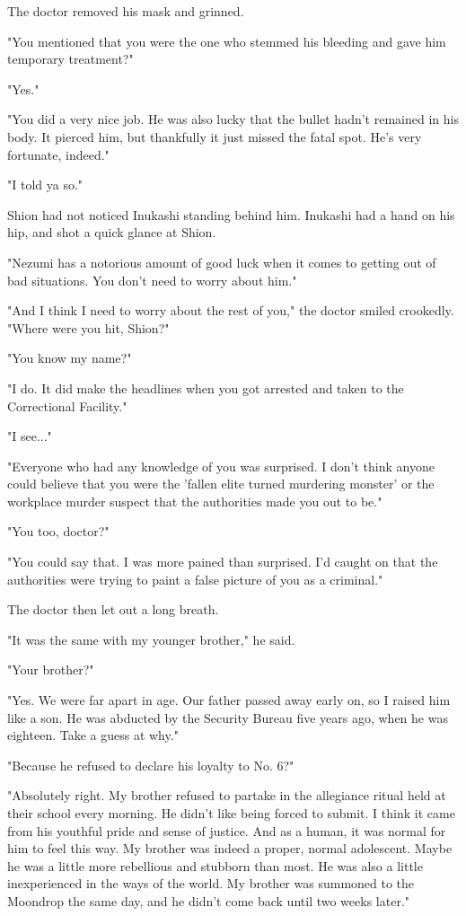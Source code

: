 The doctor removed his mask and grinned.

"You mentioned that you were the one who stemmed his bleeding and gave
him temporary treatment?"

"Yes."

"You did a very nice job. He was also lucky that the bullet hadn't
remained in his body. It pierced him, but thankfully it just missed the
fatal spot. He's very fortunate, indeed."

"I told ya so."

Shion had not noticed Inukashi standing behind him. Inukashi had a hand
on his hip, and shot a quick glance at Shion.

"Nezumi has a notorious amount of good luck when it comes to getting out
of bad situations. You don't need to worry about him."

"And I think I need to worry about the rest of you," the doctor smiled
crookedly. "Where were you hit, Shion?"

"You know my name?"

"I do. It did make the headlines when you got arrested and taken to the
Correctional Facility."

"I see..."

"Everyone who had any knowledge of you was surprised. I don't think
anyone could believe that you were the 'fallen elite turned murdering
monster' or the workplace murder suspect that the authorities made you
out to be."

"You too, doctor?"

"You could say that. I was more pained than surprised. I'd caught on
that the authorities were trying to paint a false picture of you as a
criminal."

The doctor then let out a long breath.

"It was the same with my younger brother," he said.

"Your brother?"

"Yes. We were far apart in age. Our father passed away early on, so I
raised him like a son. He was abducted by the Security Bureau five years
ago, when he was eighteen. Take a guess at why."

"Because he refused to declare his loyalty to No. 6?"

"Absolutely right. My brother refused to partake in the allegiance
ritual held at their school every morning. He didn't like being forced
to submit. I think it came from his youthful pride and sense of justice.
And as a human, it was normal for him to feel this way. My brother was
indeed a proper, normal adolescent. Maybe he was a little more
rebellious and stubborn than most. He was also a little inexperienced in
the ways of the world. My brother was summoned to the Moondrop the same
day, and he didn't come back until two weeks later."


